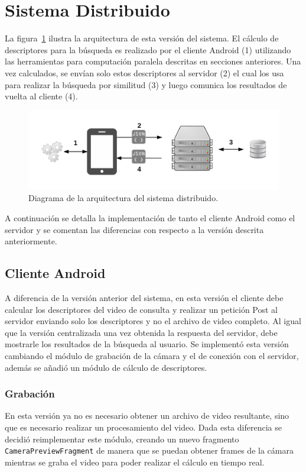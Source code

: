 \section{Sistema Distribuido}

La figura~\ref{arquitectura_distribuida} ilustra la arquitectura de esta versión del sistema. El cálculo de descriptores para la búsqueda es realizado por el cliente Android (1) utilizando las herramientas para computación paralela descritas en secciones anteriores. Una vez calculados, se envían solo estos descriptores al servidor (2) el cual los usa para realizar la búsqueda por similitud (3) y luego comunica los resultados de vuelta al cliente (4).

	\begin{figure}[!h]
		\centering
		\includegraphics[scale=1]{imagenes/cap4/arquitectura_distribuida.png}
		\caption{Diagrama de la arquitectura del sistema distribuido.}
		\label{arquitectura_distribuida}
	\end{figure}

A continuación se detalla la implementación de tanto el cliente Android como el servidor y se comentan las diferencias con respecto a la versión descrita anteriormente.

\subsection{Cliente Android}
A diferencia de la versión anterior del sistema, en esta versión el cliente debe calcular los descriptores del video de consulta y realizar un petición Post al servidor enviando solo los descriptores y no el archivo de video completo. Al igual que la versión centralizada una vez obtenida la respuesta del servidor, debe mostrarle los resultados de la búsqueda al usuario. Se implementó esta versión cambiando el módulo de grabación de la cámara y el de conexión con el servidor, además se añadió un módulo de cálculo de descriptores.

\subsubsection*{Grabación}
En esta versión ya no es necesario obtener un archivo de video resultante, sino que es necesario realizar un procesamiento del video. Dada esta diferencia se decidió reimplementar este módulo, creando un nuevo fragmento \texttt{CameraPreviewFragment} de manera que se puedan obtener frames de la cámara mientras se graba el video para poder realizar el cálculo en tiempo real.

